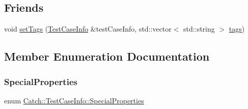 \subsection*{Friends}
\begin{DoxyCompactItemize}
\item 
void \mbox{\hyperlink{struct_catch_1_1_test_case_info_a0fe44abaf18ae7c26f98a9fc2b08679c}{set\+Tags}} (\mbox{\hyperlink{struct_catch_1_1_test_case_info}{Test\+Case\+Info}} \&test\+Case\+Info, std\+::vector$<$ std\+::string $>$ \mbox{\hyperlink{struct_catch_1_1_test_case_info_a150a7cbca1dd0c91799ccb14ff822eb0}{tags}})
\end{DoxyCompactItemize}


\subsection{Member Enumeration Documentation}
\mbox{\label{struct_catch_1_1_test_case_info_a39b232f74b4a7a6f2183b96759027eac}} 
\subsubsection{\texorpdfstring{SpecialProperties}{SpecialProperties}}
{\footnotesize\ttfamily enum \mbox{\hyperlink{struct_catch_1_1_test_case_info_a39b232f74b4a7a6f2183b96759027eac}{Catch\+::\+Test\+Case\+Info\+::\+Special\+Properties}}}

